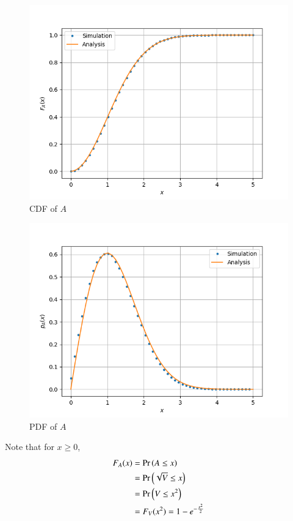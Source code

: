 \documentclass[journal,12pt,twocolumn]{IEEEtran}
\renewcommand\thesection{\arabic{section}}
\begin{document}
\begin{enumerate}[label=\thesection.\arabic*
,ref=\thesection.\theenumi]
\solution
\begin{figure}
	\includegraphics[width=\columnwidth]{figs/6_3_cdf.png}
	\caption{CDF of $A$}
	\label{fig:ral-cdf}
\end{figure}
\begin{figure}
	\includegraphics[width=\columnwidth]{figs/6_3_pdf.png}
	\caption{PDF of $A$}
	\label{fig:ral-pdf}
\end{figure}
Note that for $x \geq 0$,
\begin{align}
	F_A(x) &= \pr{A \leq x} \\
	&= \pr{\sqrt{V} \leq x} \\
	&= \pr{V \leq x^2} \\
	&= F_V(x^2) = 1 - e^{-\frac{x^2}{2}}

\end{align}
\end{enumerate}
\end{document}
